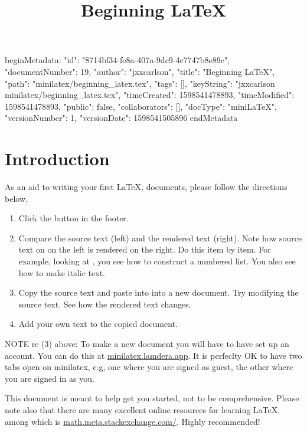 beginMetadata:
{
    "id": "8714bf34-fe8a-407a-9dc9-4c7747b8e89e",
    "documentNumber": 19,
    "author": "jxxcarlson",
    "title": "Beginning LaTeX",
    "path": "minilatex/beginning_latex.tex",
    "tags": [],
    "keyString": "jxxcarlson minilatex/beginning_latex.tex",
    "timeCreated": 1598541478893,
    "timeModified": 1598541478893,
    "public": false,
    "collaborators": [],
    "docType": "miniLaTeX",
    "versionNumber": 1,
    "versionDate": 1598541505896
}
endMetadata
\title{Beginning LaTeX }

\maketitle

\tableofcontents

\section{Introduction}


As an aid to writing your first LaTeX, documents, please follow the directions below.

\begin{enumerate}

\item Click the  button in the footer.

\item Compare the source text (left) and the rendered text (right).  Note how source text on on the left is rendered on the right.  Do this item by item.  For example, looking at , you see how to construct a numbered list.  You also see how to make italic text.

\item Copy the source text and paste into into a new document.  Try modifying the source text.  See how the rendered text changes.

\item Add  your own text to the copied document.

\end{enumerate}

NOTE re (3) above: To make a new document you will have to have set up an account.  You can do this at \href{https://minilatex.lamdera.app}{minilatex.lamdera.app}.  It is perfeclty OK to have two tabs open on minilatex, e.g, one where you are signed as guest, the other where you are signed in as you.

This document is meant to help get you started, not to be comprehensive.  Please note also that there are many excellent online resources for learning LaTeX, among which is \href{https://math.meta.stackexchange.com/questions/5020/mathjax-basic-tutorial-and-quick-reference}{math.meta.stackexchange.com/}. Highly recommended!

